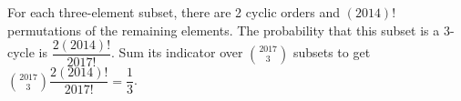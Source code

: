 For each three-element subset, there are 2 cyclic orders and $(2014)!$ permutations of the remaining elements. The probability that this subset is a 3-cycle is $\dfrac{2(2014)!}{2017!}$. Sum its indicator over $\binom{2017}3$ subsets to get $\binom{2017}3\dfrac{2(2014)!}{2017!}=\boxed{\dfrac{1}{3}}$.
